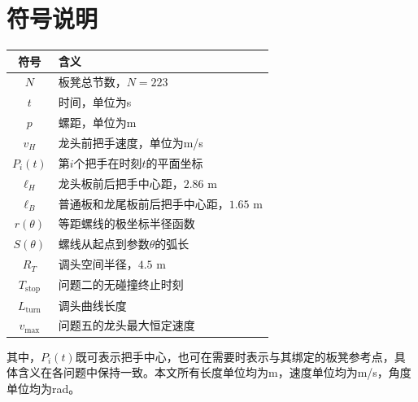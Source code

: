 \section{符号说明}
\begin{table}[H]
\centering
\begin{tabularx}{\textwidth}{CL}
\toprule
符号 & 含义 \\
\midrule
$N$ & 板凳总节数，$N=223$ \\
$t$ & 时间，单位为s \\
$p$ & 螺距，单位为m \\
$v_H$ & 龙头前把手速度，单位为m/s \\
$P_i(t)$ & 第$i$个把手在时刻$t$的平面坐标 \\
$\ell_H$ & 龙头板前后把手中心距，$2.86$ m \\
$\ell_B$ & 普通板和龙尾板前后把手中心距，$1.65$ m \\
$r(\theta)$ & 等距螺线的极坐标半径函数 \\
$S(\theta)$ & 螺线从起点到参数$\theta$的弧长 \\
$R_T$ & 调头空间半径，$4.5$ m \\
$T_{\mathrm{stop}}$ & 问题二的无碰撞终止时刻 \\
$L_{\mathrm{turn}}$ & 调头曲线长度 \\
$v_{\max}$ & 问题五的龙头最大恒定速度 \\
\bottomrule
\end{tabularx}
\end{table}

其中，$P_i(t)$既可表示把手中心，也可在需要时表示与其绑定的板凳参考点，具体含义在各问题中保持一致。本文所有长度单位均为m，速度单位均为m/s，角度单位均为rad。
